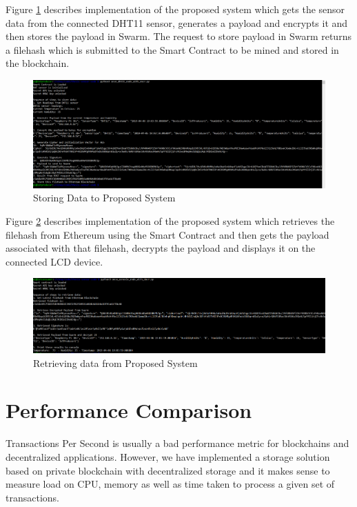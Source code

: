 \documentclass[11pt,openright]{report}
\begin{document}
Figure \ref{fig:store_prop_system_res} describes implementation of the proposed system which gets the sensor data from the connected DHT11 sensor, generates a payload and encrypts it and then stores the payload in Swarm. The request to store payload in Swarm returns a filehash which is submitted to the Smart Contract to be mined and stored in the blockchain.

\begin{figure}
    \centering
    \includegraphics[scale=0.4]{results/IoTProd.png}
    \caption{Storing Data to Proposed System}
    \label{fig:store_prop_system_res}
\end{figure}

Figure \ref{fig:retrieve_prop_system_res} describes implementation of the proposed system which retrieves the filehash from Ethereum using the Smart Contract and then gets the payload associated with that filehash, decrypts the payload and displays it on the connected LCD device.

\begin{figure}
    \centering
    \includegraphics[scale=0.4]{results/IoTConsole.png}
    \caption{Retrieving data from Proposed System}
    \label{fig:retrieve_prop_system_res}
\end{figure}

\section{Performance Comparison}
Transactions Per Second is usually a bad performance metric for blockchains and decentralized applications. However, we have implemented a storage solution based on private blockchain with decentralized storage and it makes sense to measure load on CPU, memory as well as time taken to process a given set of transactions.
\end{document}
